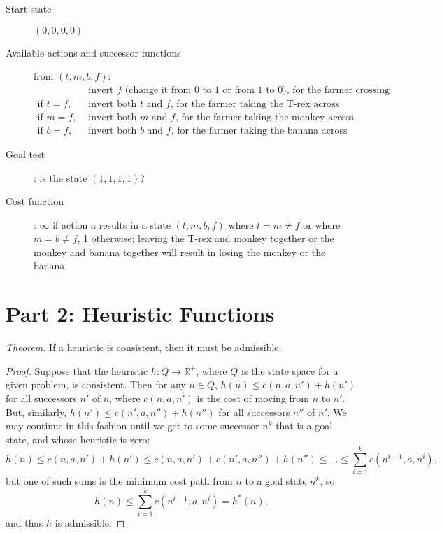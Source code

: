 \documentclass[11pt]{amsart}
\begin{document}
\begin{enumerate}
\begin{description}
\item[Start state] $(0, 0, 0, 0)$

\item[Available actions and successor functions] from $(t, m, b, f)$:
\begin{align*}
	&\text{ invert $f$ (change it from 0 to 1 or from 1 to 0), for the farmer crossing by himself} \\
	\text{if } t = f, &\text{ invert both $t$ and $f$, for the farmer taking the T-rex across} \\
	\text{if } m = f, &\text{ invert both $m$ and $f$, for the farmer taking the monkey across} \\
	\text{if } b = f, &\text{ invert both $b$ and $f$, for the farmer taking the banana across}
\end{align*}

\item[Goal test]: is the state $(1, 1, 1, 1)$?

\item[Cost function]: $\infty$ if action a results in a state $(t, m, b, f)$ where $t
= m \neq f$ or where $m = b \neq f$, 1 otherwise; leaving the T-rex and monkey together or the
monkey and banana together will result in losing the monkey or the banana.

\end{description}

\end{enumerate}

\section*{Part 2: Heuristic Functions}

\emph{Theorem.}
If a heuristic is consistent, then it must be admissible.

\begin{proof}
Suppose that the heuristic $h: Q \rightarrow \mathbb{R}^+$, where $Q$ is the state space for a given
problem, is consistent.  Then for any $n \in Q$, $h(n) \leq c(n, a, n') + h(n')$ for all successors
$n'$ of $n$, where $c(n, a, n')$ is the cost of moving from $n$ to $n'$.  But, similarly, $h(n') \leq
c(n', a, n'') + h(n'')$ for all successors $n''$ of $n'$.  We may continue in this fashion until we
get to some successor $n^k$ that is a goal state, and whose heuristic is zero:
\[
h(n) \leq c(n, a, n') + h(n') \leq c(n, a, n') + c(n', a, n'') + h(n'') \leq \dots \leq
\sum_{i = 1}^k c(n^{i-1}, a, n^i),
\]
but one of such sums is the minimum cost path from $n$ to a goal state $n^k$, so
\[
h(n) \leq \sum_{i = 1}^k c(n^{i-1}, a, n^i) = h^*(n),
\]
and thus $h$ is admissible.
\end{proof}
\end{document}

